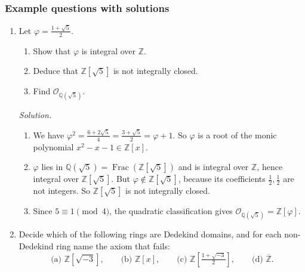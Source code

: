 \documentclass[11pt]{article}
\newcommand{\Z}{\mathbb{Z}}
\newcommand{\Q}{\mathbb{Q}}
\newcommand{\cO}{\mathcal{O}}
\DeclareMathOperator{\Frac}{Frac}
\begin{document}
\subsubsection*{Example questions with solutions}
\begin{enumerate}[label=\textbf{Q1.\arabic*}]
  \item Let $\varphi=\frac{1+\sqrt5}{2}$.
  \begin{enumerate}[label=(\alph*)]
    \item Show that $\varphi$ is integral over $\Z$.
    \item Deduce that $\Z[\sqrt5]$ is not integrally closed.
    \item Find $\cO_{\Q(\sqrt5)}$.
  \end{enumerate}

  \textit{Solution.}
  \begin{enumerate}[label=(\alph*)]
    \item We have $\varphi^2=\frac{6+2\sqrt5}{4}=\frac{3+\sqrt5}{2}=\varphi+1$. So $\varphi$ is a root of the monic polynomial $x^2-x-1\in\Z[x]$.
    \item $\varphi$ lies in $\Q(\sqrt5)=\Frac(\Z[\sqrt5])$ and is integral over $\Z$, hence integral over $\Z[\sqrt5]$. But $\varphi\notin\Z[\sqrt5]$, because its coefficients $\tfrac12,\tfrac12$ are not integers. So $\Z[\sqrt5]$ is not integrally closed.
    \item Since $5\equiv1\pmod4$, the quadratic classification gives $\cO_{\Q(\sqrt5)}=\Z[\varphi]$.
  \end{enumerate}

  \item Decide which of the following rings are Dedekind domains, and for each non-Dedekind ring name the axiom that fails:
  \[
  \text{(a) } \Z[\sqrt{-3}],\qquad \text{(b) } \Z[x],\qquad \text{(c) } \Z\!\left[\tfrac{1+\sqrt{-3}}{2}\right],\qquad \text{(d) } \overline{\Z}.
  \]


\end{enumerate}
\end{document}
